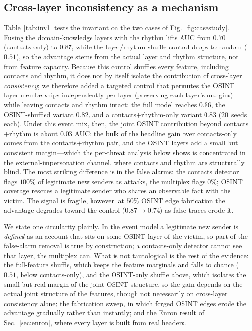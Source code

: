 \documentclass[conference]{IEEEtran}
\begin{document}
\subsection{Cross-layer inconsistency as a mechanism}
\label{sec:mechanism}
Table~\ref{tab:inv1} tests the invariant on the two cases of Fig.~\ref{fig:casestudy}. Fusing the
domain-knowledge layers with the rhythm lifts AUC from $0.70$ (contacts only) to $0.87$, while the
layer/rhythm shuffle control drops to random ($0.51$), so the advantage stems from the actual layer and
rhythm structure, not from feature capacity. Because this control shuffles every feature, including contacts
and rhythm, it does not by itself isolate the contribution of cross-layer \emph{consistency}; we therefore
added a targeted control that permutes the OSINT layer memberships independently per layer (preserving each
layer's margins) while leaving contacts and rhythm intact: the full model reaches $0.86$, the
OSINT-shuffled variant $0.82$, and a contacts$+$rhythm-only variant $0.83$ ($20$~seeds each). Under this
event mix, then, the joint OSINT contribution beyond contacts$+$rhythm is about $0.03$ AUC: the bulk of the
headline gain over contacts-only comes from the contacts$+$rhythm pair, and the OSINT layers add a small but
consistent margin---which the per-threat analysis below shows is concentrated in the external-impersonation
channel, where contacts and rhythm are structurally blind.
The most striking difference is in the false alarms: the contacts
detector flags $100\%$ of legitimate new senders as attacks, the multiplex flags $0\%$; OSINT coverage rescues
a legitimate sender who shares an observable fact with the victim. The signal is fragile, however: at $50\%$
OSINT edge fabrication the advantage degrades toward the control ($0.87\!\to\!0.74$) as false traces erode it.

We state one circularity plainly. In the event model a legitimate new sender is \emph{defined} as an account
that sits on some OSINT layer of the victim, so part of the false-alarm removal is true by construction; a
contacts-only detector cannot see that layer, the multiplex can. What is not tautological is the rest of the
evidence: the full-feature shuffle, which keeps the feature marginals and falls to chance ($0.51$, below
contacts-only), and the OSINT-only shuffle above, which isolates the small but real margin of the joint OSINT
structure, so the gain depends on the actual joint structure of the features, though not necessarily on
cross-layer consistency alone; the fabrication sweep, in which forged OSINT edges erode the advantage
gradually rather than instantly; and the Enron result of Sec.~\ref{sec:enron}, where every layer is built
from real headers.
\end{document}

